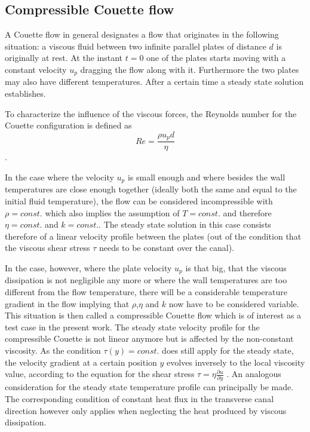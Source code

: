 \documentclass{report}
\begin{document}
\subsection{Compressible Couette flow}
\label{sec:comprCouette_genIntro}
A Couette flow in general designates a flow that originates in the following situation: a viscous fluid between two infinite parallel plates of distance $d$ is originally at rest. At the instant $t=0$ one of the plates starts moving with a constant velocity $u_p$ dragging the flow along with it. Furthermore the two plates may also have different temperatures. After a certain time a steady state solution establishes. 

To characterize the influence of the viscous forces, the Reynolds number for the Couette configuration is defined as
\begin{equation}
\label{eq:Re_comprCouette}
 Re=\frac{\rho u_p d}{\eta}
\end{equation}.

In the case where the velocity $u_p$ is small enough and where besides the wall temperatures are close enough together (ideally both the same and equal to the initial fluid temperature), the flow can be considered incompressible with $\rho=const.$ which also implies the assumption of $T=const$. and therefore $\eta=const.$ and $k=const.$. The steady state solution in this case consists therefore of a linear velocity profile between the plates (out of the condition that the viscous shear stress $\tau$ needs to be constant over the canal).

In the case, however, where the plate velocity $u_p$ is that big, that the viscous dissipation is not negligible any more or where the wall temperatures are too different from the flow temperature, there will be a considerable temperature gradient in the flow implying that $\rho$,$\eta$ and $k$ now have to be considered variable. This situation is then called a compressible Couette flow which is of interest as a test case in the present work.
The steady state velocity profile for the compressible Couette is not linear anymore but is affected by the non-constant viscosity. As the condition $\tau(y)=const.$ does still apply for the steady state, the velocity gradient at a certain position $y$ evolves inversely to the local viscosity value, according to the equation for the shear stress $\tau=\eta \frac{\partial u}{\partial y}$ \cite{Anderson2001}. 
An analogous consideration for the steady state temperature profile can principally be made. The corresponding condition of constant heat flux in the transverse canal direction however only applies when neglecting the heat produced by viscous dissipation. 
\end{document}
